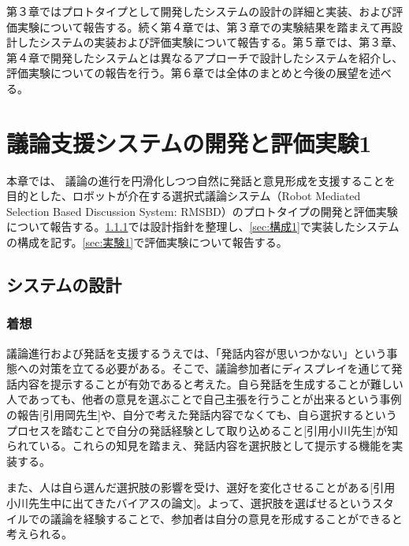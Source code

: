 \documentclass[11pt, a4paper]{jreport} %
\begin{document}
第３章ではプロトタイプとして開発したシステムの設計の詳細と実装、および評価実験について報告する。続く第４章では、第３章での実験結果を踏まえて再設計したシステムの実装および評価実験について報告する。第５章では、第３章、第４章で開発したシステムとは異なるアプローチで設計したシステムを紹介し、評価実験についての報告を行う。第６章では全体のまとめと今後の展望を述べる。




\chapter{議論支援システムの開発と評価実験1}

本章では、%
議論の進行を円滑化しつつ自然に発話と意見形成を支援することを目的とした、ロボットが介在する選択式議論システム（Robot Mediated Selection Based Discussion System: RMSBD）のプロトタイプの開発と評価実験について報告する。\ref{sec:要件1}では設計指針を整理し、\ref{sec:構成1}で実装したシステムの構成を記す。\ref{sec:実験1}で評価実験について報告する。




\section{システムの設計}
\subsection{着想}
\label{sec:要件1}
%

議論進行および発話を支援するうえでは、「発話内容が思いつかない」という事態への対策を立てる必要がある。そこで、議論参加者にディスプレイを通じて発話内容を提示することが有効であると考えた。自ら発話を生成することが難しい人であっても、他者の意見を選ぶことで自己主張を行うことが出来るという事例の報告[引用岡先生]や、自分で考えた発話内容でなくても、自ら選択するというプロセスを踏むことで自分の発話経験として取り込めること[引用小川先生]が知られている。これらの知見を踏まえ、発話内容を選択肢として提示する機能を実装する。


また、人は自ら選んだ選択肢の影響を受け、選好を変化させることがある[引用小川先生中に出てきたバイアスの論文]。よって、選択肢を選ばせるというスタイルでの議論を経験することで、参加者は自分の意見を形成することができると考えられる。
\end{document}
